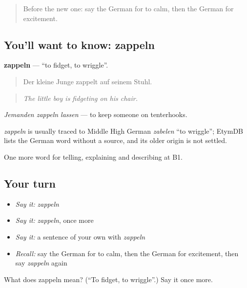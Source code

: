 \label{lesson:GE-C470-zappeln}



\begin{quote}
Before the new one: say the German for to calm, then the German for excitement.
\end{quote}

\subsection*{You'll want to know: zappeln}
\textbf{zappeln} — \textquotedblleft{}to fidget, to wriggle\textquotedblright{}.

\begin{quote}
Der kleine Junge zappelt auf seinem Stuhl.
\end{quote}

\begin{quote}
\emph{The little boy is fidgeting on his chair.}
\end{quote}

\emph{Jemanden zappeln lassen} — to keep someone on tenterhooks.

\begin{cousinweb}
\emph{zappeln} is usually traced to Middle High German \emph{zabelen} \textquotedblleft{}to wriggle\textquotedblright{}; EtymDB lists the German word without a source, and its older origin is not settled.
\end{cousinweb}

\begin{grammarlens}[title={What you've built}]
One more word for telling, explaining and describing at B1.
\end{grammarlens}

\subsection*{Your turn}
\begin{itemize}
\raggedright
  \item \emph{Say it:} \emph{zappeln}
  \item \emph{Say it:} \emph{zappeln}, once more
  \item \emph{Say it:} a sentence of your own with \emph{zappeln}
  \item \emph{Recall:} say the German for to calm, then the German for excitement, then say \emph{zappeln} again
\end{itemize}

\begin{tcolorbox}[breakable,colback=teal!4,colframe=teal!35!black,title={Before you move on}]
What does zappeln mean? (\textquotedblleft{}To fidget, to wriggle\textquotedblright{}.) Say it once more.
\end{tcolorbox}
